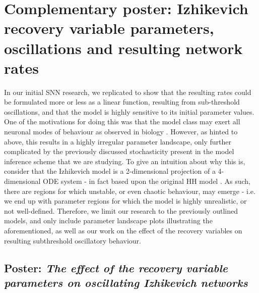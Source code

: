 \documentclass[mphil,deptreport,ianc]{infthesis} %
\begin{document}
\chapter{Complementary poster: Izhikevich recovery variable parameters, oscillations and resulting network rates}\label{chpt:izhikevich}

In our initial SNN research, we replicated \cite{Oliveira2019} to show that the resulting rates could be formulated more or less as a linear function, resulting from sub-threshold oscillations, and that the model is highly sensitive to its initial parameter values.
One of the motivations for doing this was that the model class may exert all neuronal modes of behaviour as observed in biology \cite{Izhikevich2006}.
However, as hinted to above, this results in a highly irregular parameter landscape, only further complicated by the previously discussed stochasticity present in the model inference scheme that we are studying.
To give an intuition about why this is, consider that the Izhikevich model is a 2-dimensional projection of a 4-dimensional ODE system - in fact based upon the original HH model \cite{HH1952}.
As such, there are regions for which unstable, or even chaotic behaviour, may emerge - i.e. we end up with parameter regions for which the model is highly unrealistic, or not well-defined.
Therefore, we limit our research to the previously outlined models, and only include parameter landscape plots illustrating the aforementioned, as well as our work on the effect of the recovery variables on resulting subthreshold oscillatory behaviour.



\section{Poster: \textit{The effect of the recovery variable parameters on oscillating Izhikevich networks}}\label{section:izhikevich}

\end{document}
